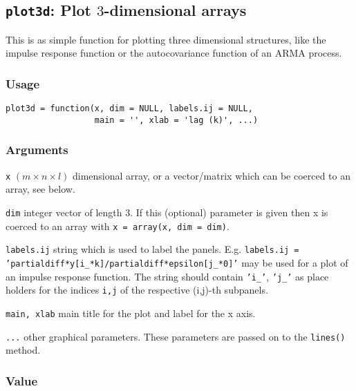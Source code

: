 \documentclass[]{article}
\begin{document}
\subsection{\texorpdfstring{\texttt{plot3d}: Plot \(3\)-dimensional
arrays}{plot3d: Plot 3-dimensional arrays}}\label{plot3d-plot-3-dimensional-arrays}

This is as simple function for plotting three dimensional structures,
like the impulse response function or the autocovariance function of an
ARMA process.

\subsubsection*{Usage}\begin{verbatim}
plot3d = function(x, dim = NULL, labels.ij = NULL,
                  main = '', xlab = 'lag (k)', ...)
\end{verbatim}\subsubsection*{Arguments}\begin{description}
\item \texttt{x}  $(m\times n\times l)$ dimensional array, 
          or a vector/matrix which can be coerced
          to an array, see below.
\item \texttt{dim} integer vector of length 3. If this (optional) parameter is given
           then x is coerced to an array with \texttt{x = array(x, dim = dim)}.
\item \texttt{labels.ij} string which is used to label the panels.
              E.g. \newline 
              \texttt{labels.ij = 'partialdiff*y[i\_*k]/partialdiff*epsilon[j\_*0]'}
              \newline 
              may be used for a plot of an impulse response function. The string
              should contain \texttt{'i\_'}, \texttt{'j\_'} as place holders for the
              indices \texttt{i,j} of the respective (i,j)-th subpanels.
\item \texttt{main, xlab} main title for the plot and label for the x axis.
\item \texttt{...} other graphical parameters. These parameters are passed on to the 
          \texttt{lines()} method.
\end{description}\subsubsection*{Value}
\end{document}
